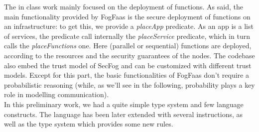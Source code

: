 \documentclass[../DraftNotes.tex]{subfiles}
\begin{document}
The in class work mainly focused on the deployment of functions. As said, the main functionality provided by FogFaas is the secure deployment of functions on an infrastructure: to get this, we provide a \emph{placeApp} predicate. As an app is a list of services, the predicate call internally the \emph{placeService} predicate, which in turn calls the \emph{placeFunctions} one. Here (parallel or sequential) functions are deployed, according to the resources and the security guarantees of the nodes.
The codebase also embed the trust model of SecFog and can be customized with different trust models. Except for this part, the basic functionalities of FogFaas don't require a probabilistic reasoning (while, as we'll see in the following, probability plays a key role in modelling communication). \\
In this preliminary work, we had a quite simple type system and few language constructs. The language has been later extended with several instructions, as well as the type system which provides some new rules.
\end{document}
